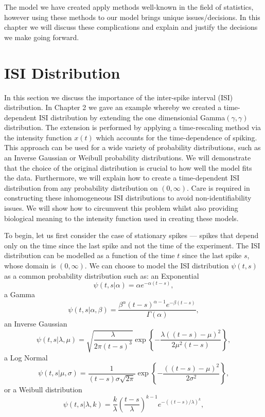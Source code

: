 \documentclass[../main.tex]{subfiles}
\begin{document}
The model we have created apply methods well-known in the field of statistics, however using these methods to our model brings unique issues/decisions. In this chapter we will discuss these complications and explain and justify the decisions we make going forward. 

\section{ISI Distribution}

In this section we discuss the importance of the inter-spike interval (ISI) distribution. In Chapter 2 we gave an example whereby we created a time-dependent ISI distribution by extending the one dimensionial  Gamma$(\gamma, \gamma)$ distribution. The extension is performed by applying a time-rescaling method via the intensity function $x(t)$ which accounts for the time-dependence of  spiking. This approach can be used for a wide variety of probability distributions, such as an Inverse Gaussian or Weibull probability distributions. We will demonstrate that the choice of the original distribution is crucial to how well the model fits the  data. Furthermore, we will explain how to create a time-dependent ISI distribution from any probability distribution on $(0,\infty)$. Care is required in constructing these inhomogeneous ISI distributions to avoid non-identifiability issues. We will show how to circumvent this problem whilst also providing biological meaning to the intensity function used in creating these models. 

To begin, let us first consider the case of stationary  spikes --- spikes that depend only on the time since the last spike and not the time of the experiment. The ISI distribution can be modelled as a function of the time $t$ since the last spike $s$, whose domain is $(0,\infty)$. We can choose to model the ISI distribution $\psi (t,s)$ as a common probability distribution such as: an Exponential  
$$ \psi (t,s | \alpha ) = \alpha e^{-\alpha (t-s)},$$
  a Gamma
   $$ \psi(t,s| \alpha, \beta ) = \frac{\beta^\alpha \left( t-s\right)^{\alpha-1} e^{-\beta(t-s)}}{\Gamma(\alpha)},$$
   an Inverse Gaussian
   $$ \psi(t,s| \lambda, \mu) =\sqrt{\frac{\lambda}{2 \pi (t-s)^3}} \exp \left\{- \frac{\lambda((t-s)-\mu)^2}{2\mu^2(t-s)} \right\}, $$
   a Log Normal
   $$\psi(t,s| \mu, \sigma) = \frac{1}{(t-s)\sigma \sqrt{2\pi}} \exp \left\{- \frac{\left( (t-s)-\mu \right)^2}{2\sigma^2} \right\}, $$
 or a Weibull distribution
   $$ \psi(t,s | \lambda, k ) = \frac{k}{\lambda}\left( \frac{t-s}{\lambda}\right)^{k-1} e^{-\left( (t-s)/\lambda\right)^k}, $$
   
\end{document}
